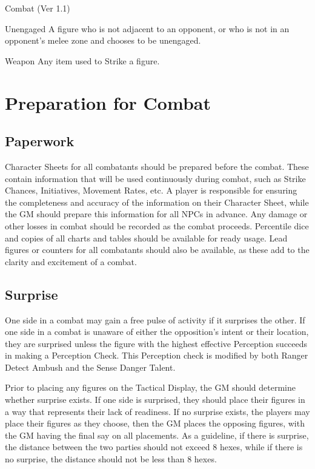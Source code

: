 \begin{Chapter}{Combat (Ver 1.1)}
\begin{Description}
\item[Unengaged] A figure who is not adjacent to an opponent, or who
  is not in an opponent’s melee zone and chooses to be unengaged.

\item[Weapon] Any item used to Strike a figure. 

\end{Description}
  
\section{Preparation for Combat}

\subsection{Paperwork}

Character Sheets for all combatants should be prepared before the
combat.  These contain information that will be used continuously
during combat, such as Strike Chances, Initiatives, Movement Rates,
etc. A player is responsible for ensuring the completeness and
accuracy of the information on their Character Sheet, while the GM
should prepare this information for all NPCs in advance.  Any damage
or other losses in combat should be recorded as the combat
proceeds. Percentile dice and copies of all charts and tables should
be available for ready usage.  Lead figures or counters for all
combatants should also be available, as these add to the clarity and
excitement of a combat.

\subsection{Surprise}

One side in a combat may gain a free pulse of activity if it surprises
the other.  If one side in a combat is unaware of either the
opposition’s intent or their location, they are surprised unless the
figure with the highest effective Perception succeeds in making a
Perception Check. This Perception check is modified by both Ranger
Detect Ambush and the Sense Danger Talent.

Prior to placing any figures on the Tactical Display, the GM should
determine whether surprise exists.  If one side is surprised, they
should place their figures in a way that represents their lack of
readiness.  If no surprise exists, the players may place their figures
as they choose, then the GM places the opposing figures, with the GM
having the final say on all placements.  As a guideline, if there is
surprise, the distance between the two parties should not exceed 8
hexes, while if there is no surprise, the distance should not be less
than 8 hexes.


\end{Chapter}
